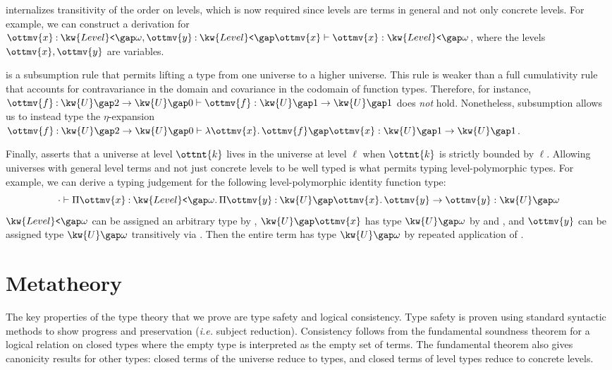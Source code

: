 \documentclass[a4paper,UKenglish,cleveref,autoref,thm-restate]{lipics-v2021}
\makeatletter
\newcommand{\ie}{\textit{i.e.}\@\xspace}
\makeatother
\begin{document}
 internalizes transitivity of the order on levels,
which is now required since levels are terms in general and not only concrete levels.
For example, we can construct a derivation for $   \ottmv{x}  \mathbin{:}   \kw{Level}\texttt{<} \gap   \omega    ,  \ottmv{y}  \mathbin{:}   \kw{Level}\texttt{<} \gap  \ottmv{x}    \vdash  \ottmv{x}  \mathrel{:}   \kw{Level}\texttt{<} \gap   \omega   $,
where the levels $\ottmv{x}, \ottmv{y}$ are variables.

 is a subsumption rule that permits lifting a type
from one universe to a higher universe.
This rule is weaker than a full cumulativity rule that accounts for
contravariance in the domain and covariance in the codomain of function types.
Therefore, for instance, $  \ottmv{f}  \mathbin{:}    \kw{U} \gap   2    \to   \kw{U} \gap   0      \vdash  \ottmv{f}  \mathrel{:}    \kw{U} \gap   1    \to   \kw{U} \gap   1    $ does \emph{not} hold.
Nonetheless, subsumption allows us to instead type the $\eta$-expansion
$  \ottmv{f}  \mathbin{:}    \kw{U} \gap   2    \to   \kw{U} \gap   0      \vdash    \lambda  \ottmv{x}  \mathpunct{.}  \ottmv{f}   \gap  \ottmv{x}   \mathrel{:}    \kw{U} \gap   1    \to   \kw{U} \gap   1    $.

Finally,  asserts that a universe at level $\ottnt{k}$
lives in the universe at level $\ell$ when $\ottnt{k}$ is strictly bounded by $\ell$.
Allowing universes with general level terms and not just concrete levels
to be well typed is what permits typing level-polymorphic types.
For example, we can derive a typing judgement for
the following level-polymorphic identity function type:
$$  \cdot   \vdash    \Pi  \ottmv{x}  \mathbin{:}   \kw{Level}\texttt{<} \gap   \omega    \mathpunct{.}   \Pi  \ottmv{y}  \mathbin{:}   \kw{U} \gap  \ottmv{x}   \mathpunct{.}  \ottmv{y}    \to  \ottmv{y}   \mathrel{:}   \kw{U} \gap   \omega   $$
$ \kw{Level}\texttt{<} \gap   \omega  $ can be assigned an arbitrary type by ,
$ \kw{U} \gap  \ottmv{x} $ has type $ \kw{U} \gap   \omega  $ by  and ,
and $\ottmv{y}$ can be assigned type $ \kw{U} \gap   \omega  $ transitively
via .
Then the entire term has type $ \kw{U} \gap   \omega  $ by repeated application of .

\section{Metatheory}

The key properties of the type theory that we prove are
type safety and logical consistency.
Type safety is proven using standard syntactic methods
to show progress and preservation (\ie subject reduction).
Consistency follows from the fundamental soundness theorem
for a logical relation on closed types
where the empty type is interpreted as the empty set of terms.
The fundamental theorem also gives canonicity results for other types:
closed terms of the universe reduce to types,
and closed terms of level types reduce to concrete levels.
\end{document}
